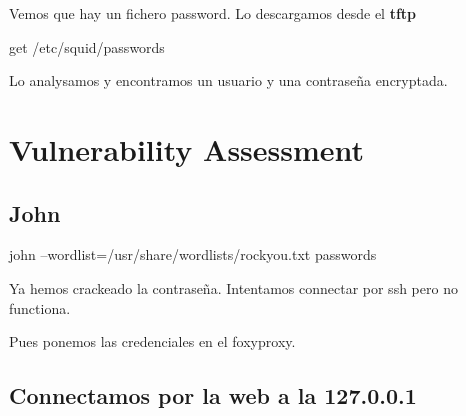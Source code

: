 \documentclass{assets/ipesethesis}
\newenvironment{Shaded}{\begin{snugshade}}{\end{snugshade}}
\newcommand{\ExtensionTok}[1]{#1}
\newcommand{\FunctionTok}[1]{\textcolor[rgb]{0.00,0.00,0.00}{#1}}
\newcommand{\KeywordTok}[1]{\textcolor[rgb]{0.13,0.29,0.53}{\textbf{#1}}}
\newcommand{\NormalTok}[1]{#1}
\newcommand{\StringTok}[1]{\textcolor[rgb]{0.31,0.60,0.02}{#1}}
\begin{document}
\begin{Shaded}
\end{Shaded}

Vemos que hay un fichero password. Lo descargamos desde el \textbf{tftp}

\begin{Shaded}
\begin{Highlighting}[]
\ExtensionTok{get}\NormalTok{ /etc/squid/passwords}
\end{Highlighting}
\end{Shaded}

Lo analysamos y encontramos un usuario y una contraseña encryptada.

\hypertarget{vulnerability-assessment-3}{%
\section*{Vulnerability Assessment}\label{vulnerability-assessment-3}}

\hypertarget{john-2}{%
\subsection*{John}\label{john-2}}

\begin{Shaded}
\begin{Highlighting}[]
\ExtensionTok{john}\NormalTok{ --wordlist=/usr/share/wordlists/rockyou.txt passwords}
\end{Highlighting}
\end{Shaded}

Ya hemos crackeado la contraseña. Intentamos connectar por ssh pero no functiona.

Pues ponemos las credenciales en el foxyproxy.

\hypertarget{connectamos-por-la-web-a-la-127.0.0.1}{%
\subsection*{Connectamos por la web a la 127.0.0.1}\label{connectamos-por-la-web-a-la-127.0.0.1}}
\end{document}
